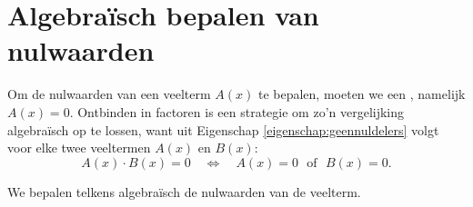 \documentclass{ximera}
\begin{document}
	\author{Koen De Naeghel}
	\label{xim:veeltermen_algebraisch_bepalen_van_nulwaarden}
\section{Algebra\"isch bepalen van nulwaarden} 

Om de nulwaarden van een veelterm $A(x)$ te bepalen, moeten we een , namelijk $A(x) = 0$. Ontbinden in factoren is een strategie om zo'n vergelijking algebra\"isch op te lossen, want 
uit Eigenschap \ref{eigenschap:geennuldelers} volgt voor elke twee veeltermen $A(x)$ en $B(x)$:
\[
A(x) \cdot B(x) = 0 \quad \Leftrightarrow \quad A(x) = 0 \,\, \text{ of } \,\, B(x)=0. 
\]  

\begin{example}
We bepalen telkens algebra\"isch de nulwaarden van de veelterm.
\begin{enumerate}


\end{enumerate}
\end{example}
\end{document}
